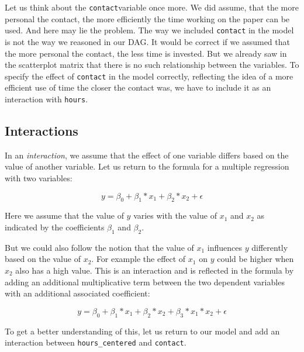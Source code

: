 \documentclass[
]{book}
\begin{document}
Let us think about the \texttt{contact}variable once more. We did assume, that the more personal the contact, the more efficiently the time working on the paper can be used. And here may lie the problem. The way we included \texttt{contact} in the model is not the way we reasoned in our DAG. It would be correct if we assumed that the more personal the contact, the less time is invested. But we already saw in the scatterplot matrix that there is no such relationship between the variables. To specify the effect of \texttt{contact} in the model correctly, reflecting the idea of a more efficient use of time the closer the contact was, we have to include it as an interaction with \texttt{hours}.

\hypertarget{interactions}{%
\subsection{Interactions}\label{interactions}}

In an \emph{interaction}, we assume that the effect of one variable differs based on the value of another variable. Let us return to the formula for a multiple regression with two variables:

\[y = \beta_0 + \beta_1*x_1 + \beta_2*x_2 + \epsilon\]

Here we assume that the value of \(y\) varies with the value of \(x_1\) and \(x_2\) as indicated by the coefficients \(\beta_1\) and \(\beta_2\).

But we could also follow the notion that the value of \(x_1\) influences \(y\) differently based on the value of \(x_2\). For example the effect of \(x_1\) on \(y\) could be higher when \(x_2\) also has a high value. This is an interaction and is reflected in the formula by adding an additional multiplicative term between the two dependent variables with an additional associated coefficient:

\[y = \beta_0 + \beta_1*x_1 + \beta_2*x_2 + \beta_3 * x_1 * x_2 + \epsilon\]

To get a better understanding of this, let us return to our model and add an interaction between \texttt{hours\_centered} and \texttt{contact}.
\end{document}
